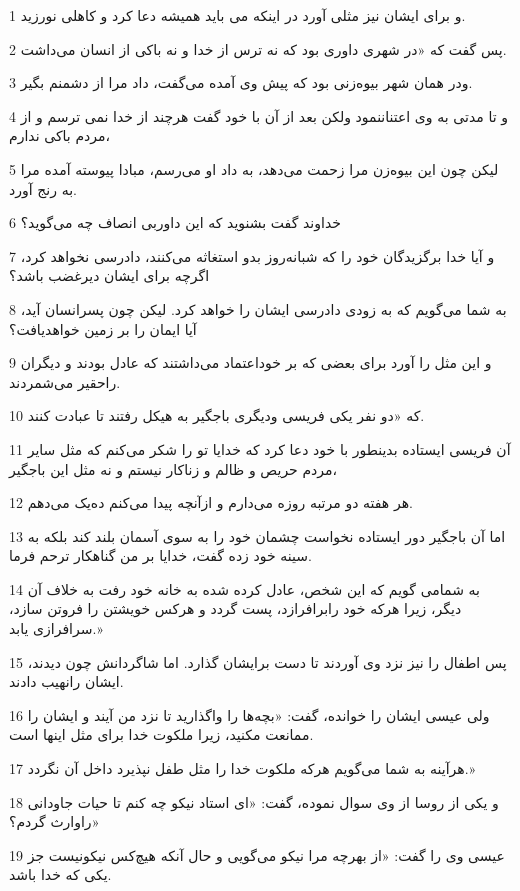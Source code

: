 \par 1 و برای ایشان نیز مثلی آورد در اینکه می باید همیشه دعا کرد و کاهلی نورزید.
\par 2 پس گفت که «در شهری داوری بود که نه ترس از خدا و نه باکی از انسان می‌داشت.
\par 3 ودر همان شهر بیوه‌زنی بود که پیش وی آمده می‌گفت، داد مرا از دشمنم بگیر.
\par 4 و تا مدتی به وی اعتناننمود ولکن بعد از آن با خود گفت هرچند از خدا نمی ترسم و از مردم باکی ندارم،
\par 5 لیکن چون این بیوه‌زن مرا زحمت می‌دهد، به داد او می‌رسم، مبادا پیوسته آمده مرا به رنج آورد.
\par 6 خداوند گفت بشنوید که این داوربی انصاف چه می‌گوید؟
\par 7 و آیا خدا برگزیدگان خود را که شبانه‌روز بدو استغاثه می‌کنند، دادرسی نخواهد کرد، اگرچه برای ایشان دیرغضب باشد؟
\par 8 به شما می‌گویم که به زودی دادرسی ایشان را خواهد کرد. لیکن چون پسرانسان آید، آیا ایمان را بر زمین خواهدیافت؟
\par 9 و این مثل را آورد برای بعضی که بر خوداعتماد می‌داشتند که عادل بودند و دیگران راحقیر می‌شمردند.
\par 10 که «دو نفر یکی فریسی ودیگری باجگیر به هیکل رفتند تا عبادت کنند.
\par 11 آن فریسی ایستاده بدینطور با خود دعا کرد که خدایا تو را شکر می‌کنم که مثل سایر مردم حریص و ظالم و زناکار نیستم و نه مثل این باجگیر،
\par 12 هر هفته دو مرتبه روزه می‌دارم و ازآنچه پیدا می‌کنم ده‌یک می‌دهم.
\par 13 اما آن باجگیر دور ایستاده نخواست چشمان خود را به سوی آسمان بلند کند بلکه به سینه خود زده گفت، خدایا بر من گناهکار ترحم فرما.
\par 14 به شمامی گویم که این شخص، عادل کرده شده به خانه خود رفت به خلاف آن دیگر، زیرا هر‌که خود رابرافرازد، پست گردد و هرکس خویشتن را فروتن سازد، سرافرازی یابد.»
\par 15 پس اطفال را نیز نزد وی آوردند تا دست برایشان گذارد. اما شاگردانش چون دیدند، ایشان رانهیب دادند.
\par 16 ولی عیسی ایشان را خوانده، گفت: «بچه‌ها را واگذارید تا نزد من آیند و ایشان را ممانعت مکنید، زیرا ملکوت خدا برای مثل اینها است.
\par 17 هرآینه به شما می‌گویم هر‌که ملکوت خدا را مثل طفل نپذیرد داخل آن نگردد.»
\par 18 و یکی از روسا از وی سوال نموده، گفت: «ای استاد نیکو چه کنم تا حیات جاودانی راوارث گردم؟»
\par 19 عیسی وی را گفت: «از بهر‌چه مرا نیکو می‌گویی و حال آنکه هیچ‌کس نیکونیست جز یکی که خدا باشد.
